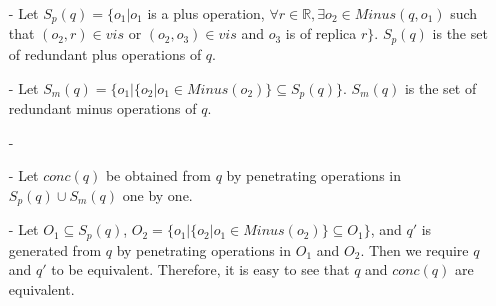 \begin{itemize}
\setlength{\itemsep}{0.5pt}
\item[-] Let $S_p(q) = \{ o_1 \vert o_1$ is a plus operation, $\forall r \in \mathbb{R}, \exists o_2 \in Minus(q,o_1)$ such that $(o_2,r) \in vis$ or $(o_2,o_3) \in vis$ and $o_3$ is of replica $r\}$. $S_p(q)$ is the set of redundant plus operations of $q$.

\item[-] Let $S_m(q) = \{ o_1 \vert  \{ o_2 \vert o_1 \in Minus(o_2) \} \subseteq S_p(q) \}$. $S_m(q)$ is the set of redundant minus operations of $q$. 

\item[-] 





\item[-] Let $conc(q)$ be obtained from $q$ by penetrating operations in $S_p(q) \cup S_m(q)$ one by one.

\item[-] Let $O_1 \subseteq S_p(q)$, $O_2 = \{ o_1 \vert  \{ o_2 \vert o_1 \in Minus(o_2) \} \subseteq O_1 \}$, and $q'$ is generated from $q$ by penetrating operations in $O_1$ and $O_2$. Then we require $q$ and $q'$ to be equivalent. Therefore, it is easy to see that $q$ and $conc(q)$ are equivalent.
\end{itemize}

